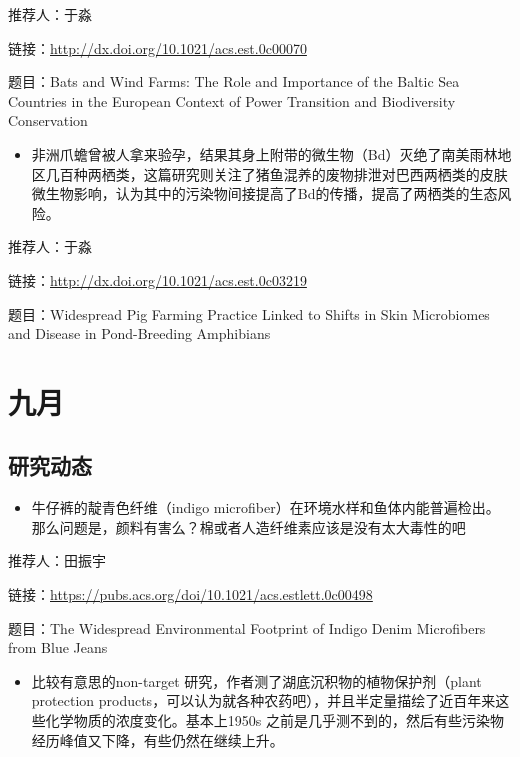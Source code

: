 \documentclass[]{book}
\providecommand{\tightlist}{%
  \setlength{\itemsep}{0pt}\setlength{\parskip}{0pt}}
\begin{document}
推荐人：于淼

链接：\url{http://dx.doi.org/10.1021/acs.est.0c00070}

题目：Bats and Wind Farms: The Role and Importance of the Baltic Sea Countries in the European Context of Power Transition and Biodiversity Conservation

\begin{itemize}
\tightlist
\item
  非洲爪蟾曾被人拿来验孕，结果其身上附带的微生物（Bd）灭绝了南美雨林地区几百种两栖类，这篇研究则关注了猪鱼混养的废物排泄对巴西两栖类的皮肤微生物影响，认为其中的污染物间接提高了Bd的传播，提高了两栖类的生态风险。
\end{itemize}

推荐人：于淼

链接：\url{http://dx.doi.org/10.1021/acs.est.0c03219}

题目：Widespread Pig Farming Practice Linked to Shifts in Skin Microbiomes and Disease in Pond-Breeding Amphibians

\hypertarget{ux4e5dux6708-2}{%
\section*{九月}\label{ux4e5dux6708-2}}

\hypertarget{ux7814ux7a76ux52a8ux6001-34}{%
\subsection*{研究动态}\label{ux7814ux7a76ux52a8ux6001-34}}

\begin{itemize}
\tightlist
\item
  牛仔裤的靛青色纤维（indigo microfiber）在环境水样和鱼体内能普遍检出。那么问题是，颜料有害么？棉或者人造纤维素应该是没有太大毒性的吧
\end{itemize}

推荐人：田振宇

链接：\url{https://pubs.acs.org/doi/10.1021/acs.estlett.0c00498}

题目：The Widespread Environmental Footprint of Indigo Denim Microfibers from Blue Jeans

\begin{itemize}
\tightlist
\item
  比较有意思的non-target 研究，作者测了湖底沉积物的植物保护剂（plant protection products，可以认为就各种农药吧），并且半定量描绘了近百年来这些化学物质的浓度变化。基本上1950s 之前是几乎测不到的，然后有些污染物经历峰值又下降，有些仍然在继续上升。
\end{itemize}
\end{document}
